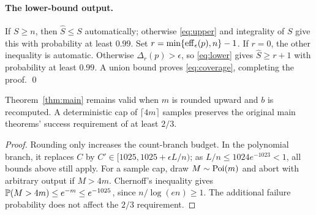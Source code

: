 \paragraph{The lower-bound output.}
If $S\ge n$, then $\widehat S\le S$ automatically; otherwise
\eqref{eq:upper} and integrality of $S$ give this with probability at least
$0.99$. Set $r=\min\{\operatorname{eff}_\epsilon(p),n\}-1$. If $r=0$, the other
inequality is automatic. Otherwise $\Delta_r(p)>\epsilon$, so
\eqref{eq:lower} gives $\widehat S\ge r+1$ with probability at least $0.99$.
A union bound proves \eqref{eq:coverage}, completing the proof.
\qed

\begin{corollary}\label{cor:rounding}
Theorem~\ref{thm:main} remains valid when $m$ is rounded upward and $b$ is
recomputed. A deterministic cap of $\lceil4m\rceil$ samples preserves the
original main theorems' success requirement of at least $2/3$.
\end{corollary}
\begin{proof}
Rounding only increases the count-branch budget. In the polynomial branch,
it replaces $C$ by $C'\in[1025,1025+\epsilon L/n)$; as
$L/n\le1024e^{-1023}<1$, all bounds above still apply.
For a sample cap, draw $M\sim\operatorname{Poi}(m)$ and abort with arbitrary output if
$M>4m$. Chernoff's inequality gives
$\mathbb P(M>4m)\le e^{-m}\le e^{-1025}$, since $n/\log(en)\ge1$.
The additional failure probability does not affect the $2/3$ requirement.
\end{proof}

